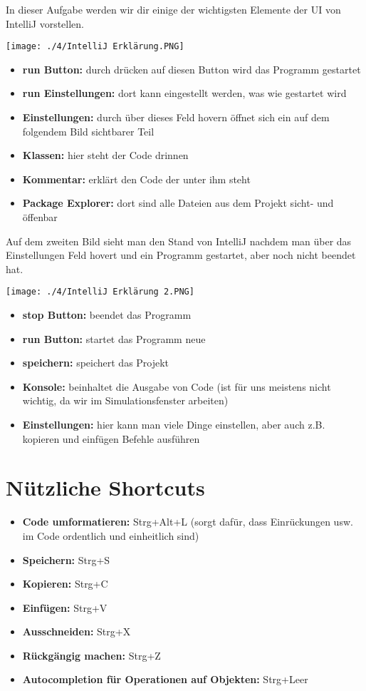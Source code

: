 
In dieser Aufgabe werden wir dir einige der wichtigsten Elemente der UI von IntelliJ vorstellen.
\begin{center}
    \texttt{[image: ./4/IntelliJ Erklärung.PNG]}
\end{center}
\begin{itemize}
    \item \textbf{run Button:} durch drücken auf diesen Button wird das Programm gestartet
    \item \textbf{run Einstellungen:} dort kann eingestellt werden, was wie gestartet wird
    \item \textbf{Einstellungen:} durch über dieses Feld hovern öffnet sich ein auf dem folgendem Bild sichtbarer Teil
    \item \textbf{Klassen:} hier steht der Code drinnen
    \item \textbf{Kommentar:} erklärt den Code der unter ihm steht
    \item \textbf{Package Explorer:} dort sind alle Dateien aus dem Projekt sicht- und öffenbar
\end{itemize}
\newpage
Auf dem zweiten Bild sieht man den Stand von IntelliJ nachdem man über das Einstellungen Feld hovert und ein Programm gestartet, aber noch nicht beendet hat.
\begin{center}
    \texttt{[image: ./4/IntelliJ Erklärung 2.PNG]}
\end{center}
\begin{itemize}
    \item \textbf{stop Button:} beendet das Programm
    \item \textbf{run Button:} startet das Programm neue
    \item \textbf{speichern:} speichert das Projekt
    \item \textbf{Konsole:} beinhaltet die Ausgabe von Code (ist für uns meistens nicht wichtig, da wir im Simulationsfenster arbeiten)
    \item \textbf{Einstellungen:} hier kann man viele Dinge einstellen, aber auch z.B. kopieren und einfügen Befehle ausführen
\end{itemize}
\newpage
\section*{Nützliche Shortcuts}
\begin{itemize}
    \item \textbf{Code umformatieren:} Strg+Alt+L (sorgt dafür, dass Einrückungen usw. im Code ordentlich und einheitlich sind)
    \item \textbf{Speichern:} Strg+S
    \item \textbf{Kopieren:} Strg+C 
    \item \textbf{Einfügen:} Strg+V
    \item \textbf{Ausschneiden:} Strg+X
    \item \textbf{Rückgängig machen:} Strg+Z
    \item \textbf{Autocompletion für Operationen auf Objekten:} Strg+Leer
\end{itemize}
